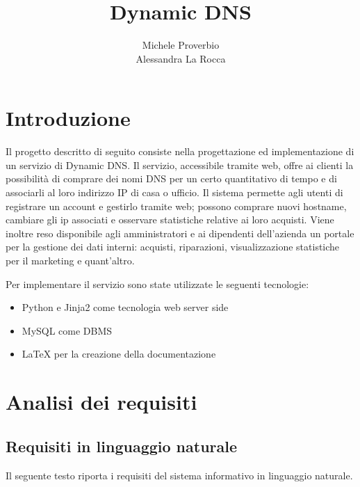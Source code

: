 \documentclass[11pt,a4paper] {article}
\title {\textbf{Dynamic DNS}}
\author {Michele Proverbio\\
		Alessandra La Rocca}
\date {}
\begin{document}
\maketitle

\newpage
\tableofcontents

\newpage
\section{Introduzione}

Il progetto descritto di seguito consiste nella progettazione ed implementazione di un servizio di Dynamic DNS. Il servizio, accessibile tramite web, offre ai clienti la possibilit\`a di comprare dei nomi DNS per un certo quantitativo di tempo e di associarli al loro indirizzo IP di casa o ufficio.
Il sistema permette agli utenti di registrare un account e gestirlo tramite web; possono comprare nuovi hostname, cambiare gli ip associati e osservare statistiche relative ai loro acquisti.
Viene inoltre reso disponibile agli amministratori e ai dipendenti dell'azienda un portale per la gestione dei dati interni: acquisti, riparazioni, visualizzazione statistiche per il marketing e quant'altro.

Per implementare il servizio sono state utilizzate le seguenti tecnologie:
\begin{itemize}
\item Python e Jinja2 come tecnologia web server side
\item MySQL come DBMS
\item LaTeX per la creazione della documentazione
\end{itemize}

\newpage
\section{Analisi dei requisiti}

\subsection{Requisiti in linguaggio naturale}
Il seguente testo riporta i requisiti del sistema informativo in linguaggio naturale. \\
\\
\end{document}
